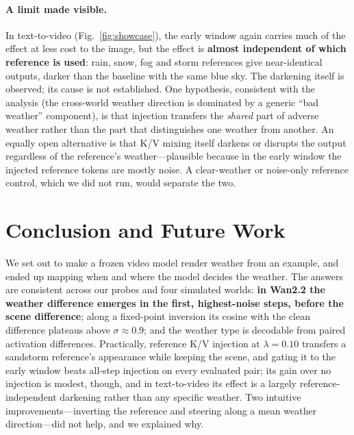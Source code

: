 \documentclass[11pt,a4paper]{article}
\newcommand{\lam}{\lambda}
\begin{document}
\paragraph{A limit made visible.}
In text-to-video (Fig.~\ref{fig:showcase}), the early window again carries much of the effect at less cost to the image, but the effect is \textbf{almost independent of which reference is used}: rain, snow, fog and storm references give near-identical outputs, darker than the baseline with the same blue sky.
The darkening itself is observed; its cause is not established. One hypothesis, consistent with the analysis (the cross-world weather direction is dominated by a generic ``bad weather'' component), is that injection transfers the \emph{shared} part of adverse weather rather than the part that distinguishes one weather from another. An equally open alternative is that K/V mixing itself darkens or disrupts the output regardless of the reference's weather---plausible because in the early window the injected reference tokens are mostly noise. A clear-weather or noise-only reference control, which we did not run, would separate the two.

\section{Conclusion and Future Work}

We set out to make a frozen video model render weather from an example, and ended up mapping when and where the model decides the weather.
The answers are consistent across our probes and four simulated worlds: \textbf{in Wan2.2 the weather difference emerges in the first, highest-noise steps, before the scene difference}; along a fixed-point inversion its cosine with the clean difference plateaus above $\sigma\approx0.9$; and the weather type is decodable from paired activation differences.
Practically, reference K/V injection at $\lam{=}0.10$ transfers a sandstorm reference's appearance while keeping the scene, and gating it to the early window beats all-step injection on every evaluated pair; its gain over no injection is modest, though, and in text-to-video its effect is a largely reference-independent darkening rather than any specific weather.
Two intuitive improvements---inverting the reference and steering along a mean weather direction---did not help, and we explained why.
\end{document}
